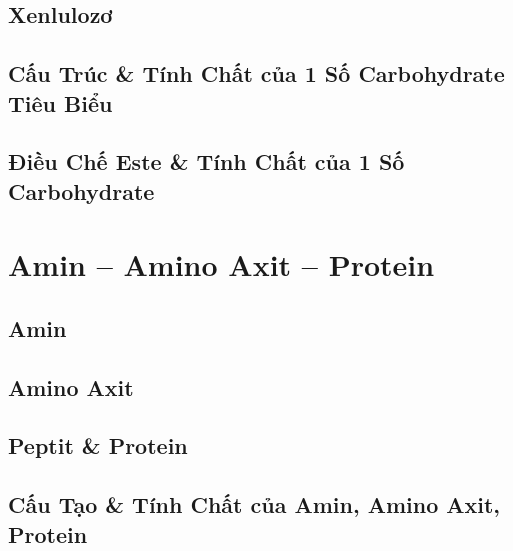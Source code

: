 \documentclass{article}
\numberwithin{equation}{section}
\begin{document}

\subsection{Xenlulozơ}


\subsection{Cấu Trúc \& Tính Chất của 1 Số Carbohydrate Tiêu Biểu}


\subsection{Điều Chế Este \& Tính Chất của 1 Số Carbohydrate}


\section{Amin -- Amino Axit -- Protein}

\subsection{Amin}


\subsection{Amino Axit}


\subsection{Peptit \& Protein}


\subsection{Cấu Tạo \& Tính Chất của Amin, Amino Axit, Protein}
\end{document}
